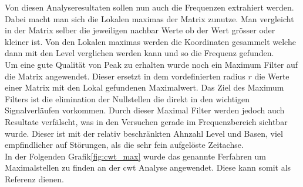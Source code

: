 Von diesen Analyseresultaten sollen nun auch die Frequenzen extrahiert werden. Dabei macht man sich die Lokalen maximas der Matrix zunutze. Man vergleicht in der Matrix selber die jeweiligen nachbar Werte ob der Wert grösser oder kleiner ist. Von den Lokalen maximas werden die Koordinaten gesammelt welche dann mit den Level verglichen werden kann und so die Frequenz gefunden.\\
Um eine gute Qualität von Peak zu erhalten wurde noch ein Maximum Filter auf die Matrix angewendet. Dieser ersetzt in dem vordefinierten radius $r$ die Werte einer Matrix mit den Lokal gefundenen Maximalwert. Das Ziel des Maximum Filters ist die elimination der Nullstellen die direkt in den wichtigen Signalverläufen vorkommen. Durch dieser Maximal Filter werden jedoch auch Resultate verfälscht, was in den Versuchen gerade im Frequenzbereich sichtbar wurde. Dieser ist mit der relativ beschränkten Ahnzahl Level und Basen, viel empfindlicher auf Störungen, als die sehr fein aufgelöste Zeitachse. \\
In der Folgenden Grafik\ref{fig:cwt_max} wurde das genannte Ferfahren um Maximalstellen zu finden an der cwt Analyse angewendet. Diese kann somit als Referenz dienen. 

